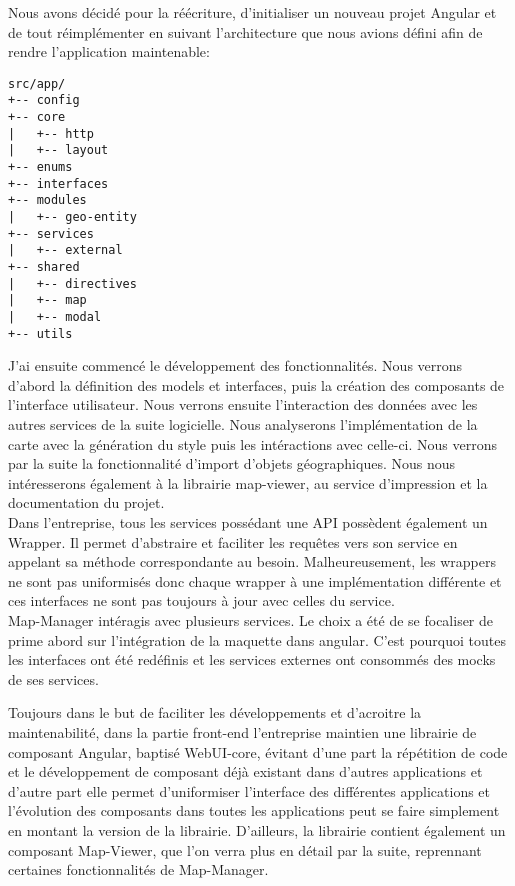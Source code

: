 \documentclass{rapportUHA40}
\begin{document}
Nous avons décidé pour la réécriture, d'initialiser un nouveau projet Angular
et de tout réimplémenter en suivant l'architecture que nous avions défini afin
de rendre l'application maintenable:

\begin{verbatim}
src/app/
+-- config
+-- core
|   +-- http
|   +-- layout
+-- enums
+-- interfaces
+-- modules
|   +-- geo-entity
+-- services
|   +-- external
+-- shared
|   +-- directives
|   +-- map
|   +-- modal
+-- utils
\end{verbatim}

J'ai ensuite commencé le développement des fonctionnalités. Nous verrons
d'abord la définition des models et interfaces, puis la création des composants
de l'interface utilisateur. Nous verrons ensuite l'interaction des données avec
les autres services de la suite logicielle. Nous analyserons l'implémentation
de la carte avec la génération du style puis les intéractions avec celle-ci.
Nous verrons par la suite la fonctionnalité d'import d'objets géographiques.
Nous nous intéresserons également à la librairie map-viewer, au service
d'impression et la documentation du projet.\\

Dans l'entreprise, tous les services possédant une API possèdent également un
Wrapper. Il permet d'abstraire et faciliter les requêtes vers son service en
appelant sa méthode correspondante au besoin. Malheureusement, les wrappers ne
sont pas uniformisés donc chaque wrapper à une implémentation différente et ces
interfaces ne sont pas toujours à jour avec celles du service.\\ Map-Manager
intéragis avec plusieurs services. Le choix a été de se focaliser de prime
abord sur l'intégration de la maquette dans angular. C'est pourquoi toutes les
interfaces ont été redéfinis et les services externes ont consommés des mocks
de ses services.

Toujours dans le but de faciliter les développements et d'acroitre la
maintenabilité, dans la partie front-end l'entreprise maintien une librairie de
composant Angular, baptisé WebUI-core, évitant d'une part la répétition de code
et le développement de composant déjà existant dans d'autres applications et
d'autre part elle permet d'uniformiser l'interface des différentes applications
et l'évolution des composants dans toutes les applications peut se faire
simplement en montant la version de la librairie. D'ailleurs, la librairie
contient également un composant Map-Viewer, que l'on verra plus en détail par
la suite, reprennant certaines fonctionnalités de Map-Manager.
\end{document}
